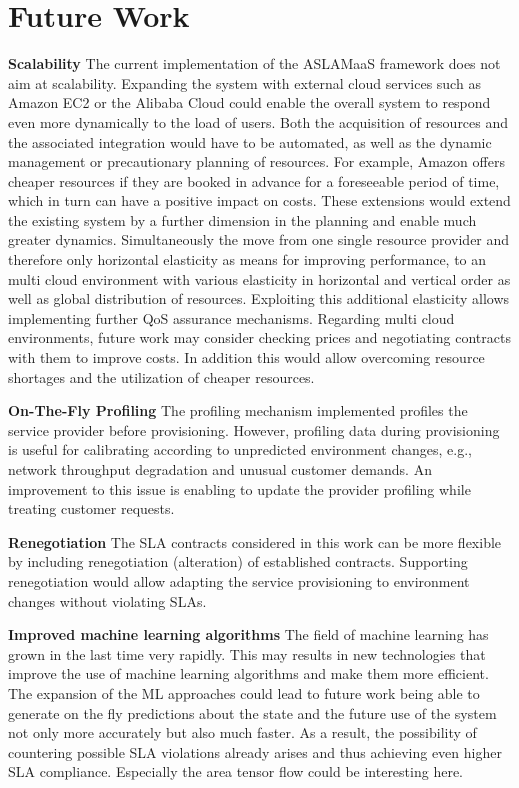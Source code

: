 \section{Future Work}
\textbf{Scalability }
The current implementation of the ASLAMaaS framework does not aim at scalability. Expanding the system with external cloud services such as Amazon EC2 or the Alibaba Cloud could enable the overall system to respond even more dynamically to the load of users. Both the acquisition of resources and the associated integration would have to be automated, as well as the dynamic management or precautionary planning of resources. For example, Amazon offers cheaper resources if they are booked in advance for a foreseeable period of time, which in turn can have a positive impact on costs. These extensions would extend the existing system by a further dimension in the planning and enable much greater dynamics. Simultaneously the move from one single resource provider and therefore only horizontal elasticity as means for improving performance, to an multi cloud environment with various elasticity in horizontal and vertical order as well as global distribution of resources. Exploiting this additional elasticity allows implementing further QoS assurance mechanisms. Regarding multi cloud environments, future work may consider checking prices and negotiating contracts with them to improve costs. In addition this would allow overcoming resource shortages and the utilization of cheaper resources.

\textbf{On-The-Fly Profiling} The profiling mechanism implemented profiles the service provider before provisioning. However, profiling data during provisioning is useful for calibrating  according to unpredicted environment changes, e.g., network throughput degradation and unusual customer demands. An improvement to this issue is enabling to update the provider profiling while treating customer requests. 

\textbf{Renegotiation} The SLA contracts considered in this work can be more flexible by including renegotiation (alteration) of established contracts. Supporting renegotiation would allow adapting the service provisioning to environment changes without violating SLAs. 

\textbf{Improved machine learning algorithms} The field of machine learning has grown in the last time very rapidly. This may results in new technologies that improve the use of machine learning algorithms and make them more efficient. The expansion of the ML approaches could lead to future work being able to generate on the fly predictions about the state and the future use of the system not only more accurately but also much faster. As a result, the possibility of countering possible SLA violations already arises and thus achieving even higher SLA compliance. Especially the area tensor flow could be interesting here.

